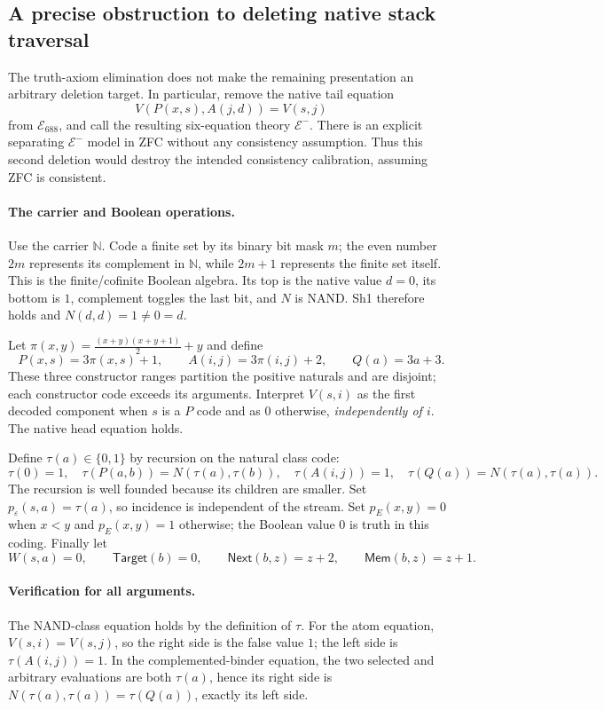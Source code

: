 \subsection{A precise obstruction to deleting native stack traversal}
\label{sec:tail-deletion}

The truth-axiom elimination does not make the remaining presentation an
arbitrary deletion target. In particular, remove the native tail equation
\[
 V(P(x,s),A(j,d))=V(s,j)
 \tag{Tail}
\]
from $\mathcal E_{688}$, and call the resulting six-equation theory
$\mathcal E^-$. There is an explicit separating $\mathcal E^-$ model in
ZFC without any consistency assumption. Thus this second deletion would
destroy the intended consistency calibration, assuming ZFC is consistent.

\paragraph{The carrier and Boolean operations.}
Use the carrier $\mathbb N$. Code a finite set by its binary bit mask $m$;
the even number $2m$ represents its complement in $\mathbb N$, while
$2m+1$ represents the finite set itself. This is the finite/cofinite
Boolean algebra. Its top is the native value $d=0$, its bottom is $1$,
complement toggles the last bit, and $N$ is NAND. Sh1 therefore holds and
$N(d,d)=1\ne0=d$.

Let $\pi(x,y)=\frac{(x+y)(x+y+1)}2+y$ and define
\[
 P(x,s)=3\pi(x,s)+1,\qquad A(i,j)=3\pi(i,j)+2,
 \qquad Q(a)=3a+3.
\]
These three constructor ranges partition the positive naturals and are
disjoint; each constructor code exceeds its arguments. Interpret
$V(s,i)$ as the first decoded component when $s$ is a $P$ code and as
$0$ otherwise, \emph{independently of $i$}. The native head equation holds.

Define $\tau(a)\in\{0,1\}$ by recursion on the natural class code:
\[
 \tau(0)=1,\quad
 \tau(P(a,b))=N(\tau(a),\tau(b)),\quad
 \tau(A(i,j))=1,\quad
 \tau(Q(a))=N(\tau(a),\tau(a)).
\]
The recursion is well founded because its children are smaller.
Set $p_\varepsilon(s,a)=\tau(a)$, so incidence is independent of the stream.
Set $p_E(x,y)=0$ when $x<y$ and $p_E(x,y)=1$ otherwise; the Boolean value
$0$ is truth in this coding. Finally let
\[
 W(s,a)=0,\qquad\mathsf{Target}(b)=0,\qquad
 \mathsf{Next}(b,z)=z+2,\qquad\mathsf{Mem}(b,z)=z+1.
\]

\paragraph{Verification for all arguments.}
The NAND-class equation holds by the definition of $\tau$. For the atom
equation, $V(s,i)=V(s,j)$, so the right side is the false value $1$;
the left side is $\tau(A(i,j))=1$. In the complemented-binder equation,
the two selected and arbitrary evaluations are both $\tau(a)$, hence its
right side is $N(\tau(a),\tau(a))=\tau(Q(a))$, exactly its left side.

